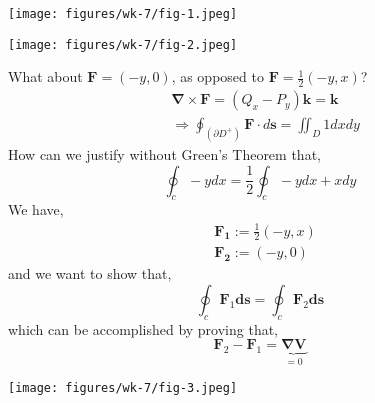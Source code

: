 	\begin{center}
    \texttt{[image: figures/wk-7/fig-1.jpeg]}
    \end{center}

	\begin{center}
    \texttt{[image: figures/wk-7/fig-2.jpeg]}
    \end{center}

    \begin{rmk}
    	What about $\mathbf{F} = (-y, 0)$, as opposed to $\mathbf{F} = \frac{1}{2}(-y, x)$?
    	\[\begin{aligned}
		&\mathbf{\nabla} \times \mathbf{F}=\left(Q_x-P_y\right) \mathbf{k}=\mathbf{k} \\
		&\Rightarrow \oint_{\left(\partial D^{+}\right)} \mathbf{F} \cdot d \mathbf{s}=\iint_D 1 d x d y
		\end{aligned}\]
		How can we justify without Green's Theorem that,
		\[\oint_c-y d x=\frac{1}{2} \oint_c-y d x+x d y\]
		We have,
		\[\begin{aligned}
		&\mathbf{F_1}:=\frac{1}{2}(-y, x) \\
		&\mathbf{F_2}:=(-y, 0)
		\end{aligned}\]
		and we want to show that,
		\[\oint_c \mathbf{F}_1 \mathbf{d s}=\oint_c \mathbf{F}_2 \mathbf{d s}\]
		which can be accomplished by proving that,
		\[\mathbf{F}_2 - \mathbf{F}_1 = \underbrace{\mathbf{\nabla{V}}}_{=0}\]
    \end{rmk}

 	\begin{center}
    \texttt{[image: figures/wk-7/fig-3.jpeg]}
    \end{center}